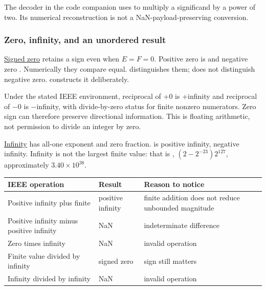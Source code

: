 The decoder in the code companion uses  to multiply a significand by a power of two. Its numerical reconstruction is not a NaN-payload-preserving conversion.

\subsubsection{Zero, infinity, and an unordered result}\label{01-foundations-i-ch001-zero-infinity-and-an-unordered-result}

\hypertarget{01-foundations-i-ch001-zero-infinity-and-an-unordered-result}{}

\hyperref[appendix-3a048f032c1f]{Signed zero} retains a sign even when \(E=F=0\). Positive zero is  and negative zero . Numerically they compare equal.  distinguishes them;  does not distinguish negative zero.  constructs it deliberately.

Under the stated IEEE environment, reciprocal of +0 is +infinity and reciprocal of −0 is −infinity, with divide-by-zero status for finite nonzero numerators. Zero sign can therefore preserve directional information. This is floating arithmetic, not permission to divide an integer by zero.

\hyperref[appendix-eb336149c00a]{Infinity} has all-one exponent and zero fraction.  is positive infinity,  negative infinity. Infinity is not the largest finite value: that is , \((2-2^{-23})2^{127}\), approximately \(3.40\times10^{38}\).

{\def\LTcaptype{none} %
\begin{longtable}[]{@{}
  >{\raggedright\arraybackslash}p{}
  >{\raggedright\arraybackslash}p{}
  >{\raggedright\arraybackslash}p{}@{}}
\toprule\noalign{}
\begin{minipage}[b]{\linewidth}\raggedright
IEEE operation
\end{minipage} & \begin{minipage}[b]{\linewidth}\raggedright
Result
\end{minipage} & \begin{minipage}[b]{\linewidth}\raggedright
Reason to notice
\end{minipage} \\
\midrule\noalign{}
\endhead
\bottomrule\noalign{}
\endlastfoot
Positive infinity plus finite & positive infinity & finite addition does not reduce unbounded magnitude \\
Positive infinity minus positive infinity & NaN & indeterminate difference \\
Zero times infinity & NaN & invalid operation \\
Finite value divided by infinity & signed zero & sign still matters \\
Infinity divided by infinity & NaN & invalid operation \\
\end{longtable}
}


